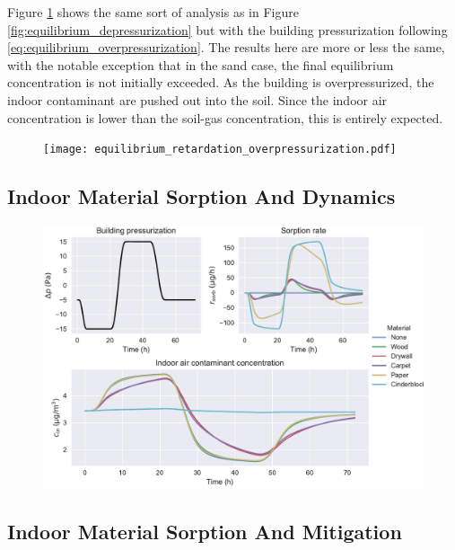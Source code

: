 Figure \ref{fig:equilibrium_overpressurization} shows the same sort of analysis as in Figure \ref{fig:equilibrium_depressurization} but with the building pressurization following \eqref{eq:equilibrium_overpressurization}.
The results here are more or less the same, with the notable exception that in the sand case, the final equilibrium concentration is not initially exceeded.
As the building is overpressurized, the indoor contaminant are pushed out into the soil.
Since the indoor air concentration is lower than the soil-gas concentration, this is entirely expected.\par

\begin{figure}[!htb]
  \texttt{[image: equilibrium\_retardation\_overpressurization.pdf]}
  \caption{}
  \label{fig:equilibrium_overpressurization}
\end{figure}


\subsection{Indoor Material Sorption And Dynamics}


\begin{figure}[!htb]
  \includegraphics[width=\textwidth]{sorption_indoor_cycle.pdf}
  \caption{}
  \label{fig:indoor_sorption_cycle}
\end{figure}


\subsection{Indoor Material Sorption And Mitigation}


